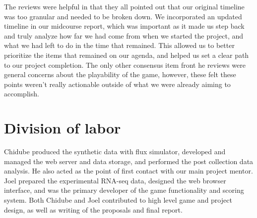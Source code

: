 \documentclass[12pt]{article}
\begin{document}
The reviews were helpful in that they all pointed out that our original timeline was too granular and needed to be broken down. We incorporated an updated timeline in our midcourse
report, which was important as it made us step back and truly analyze how far we had come from when we started the project, and what we had left to do in the time that remained. This
allowed us to better prioritize the items that remained on our agenda, and helped us set a clear path to our project completion. The only other consensus item front he reviews were general
concerns about the playability of the game, however, these felt these points weren't really actionable outside of what we were already aiming to accomplish.

\section*{Division of labor}

Chidube produced the synthetic data with flux simulator, developed and managed the web server and data storage, and performed the post collection data analysis. He also acted as the point
 of first contact with our main project mentor. Joel prepared the experimental RNA-seq data, designed the web browser interface, and was the primary developer of the game functionality and 
 scoring system. Both Chidube and Joel contributed to high level game and project design, as well as writing of the proposals and final report.


\end{document}
